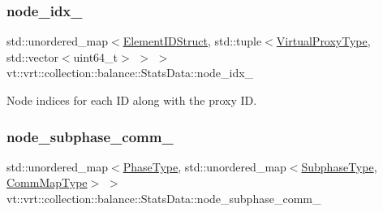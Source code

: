 \mbox{\label{structvt_1_1vrt_1_1collection_1_1balance_1_1_stats_data_a28e705281f97d1afd659848de7af7d7b}} 
\subsubsection{\texorpdfstring{node\+\_\+idx\+\_\+}{node\_idx\_}}
{\footnotesize\ttfamily std\+::unordered\+\_\+map$<$\hyperlink{structvt_1_1vrt_1_1collection_1_1balance_1_1_element_i_d_struct}{Element\+I\+D\+Struct}, std\+::tuple$<$\hyperlink{namespacevt_a1b417dd5d684f045bb58a0ede70045ac}{Virtual\+Proxy\+Type}, std\+::vector$<$uint64\+\_\+t$>$ $>$ $>$ vt\+::vrt\+::collection\+::balance\+::\+Stats\+Data\+::node\+\_\+idx\+\_\+}



Node indices for each ID along with the proxy ID. 

\mbox{\label{structvt_1_1vrt_1_1collection_1_1balance_1_1_stats_data_ac78802ff554a4d802a163afa5756412e}} 
\subsubsection{\texorpdfstring{node\+\_\+subphase\+\_\+comm\+\_\+}{node\_subphase\_comm\_}}
{\footnotesize\ttfamily std\+::unordered\+\_\+map$<$\hyperlink{namespacevt_a46ce6733d5cdbd735d561b7b4029f6d7}{Phase\+Type}, std\+::unordered\+\_\+map$<$\hyperlink{namespacevt_ae78cbfdf1e57470e33eedb074f2beeba}{Subphase\+Type}, \hyperlink{namespacevt_1_1vrt_1_1collection_1_1balance_a10860c956804d644db54a16012352728}{Comm\+Map\+Type}$>$ $>$ vt\+::vrt\+::collection\+::balance\+::\+Stats\+Data\+::node\+\_\+subphase\+\_\+comm\+\_\+}



